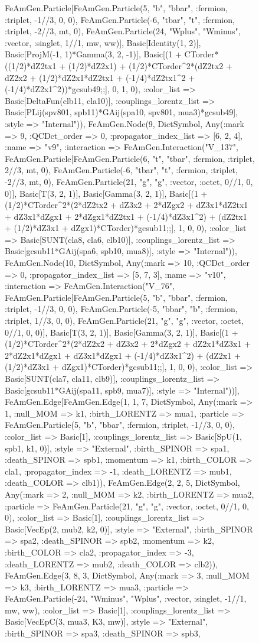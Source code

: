 \documentclass{revtex4}
\begin{document}
\begin{figure}[!htb]
\begin{center}
{FeAmGen.Particle[FeAmGen.Particle(5, "b", "bbar", :fermion, :triplet, -1//3, 0, 0), FeAmGen.Particle(-6, "tbar", "t", :fermion, :triplet, -2//3, mt, 0), FeAmGen.Particle(24, "Wplus", "Wminus", :vector, :singlet, 1//1, mw, ww)], Basic[Identity(1, 2)], Basic[ProjM(-1, 1)*Gamma(3, 2, -1)], Basic[(1 + CTorder*((1/2)*dZ2tx1 + (1/2)*dZ2x1) + (1/2)*CTorder^2*(dZ2tx2 + dZ2x2 + (1/2)*dZ2x1*dZ2tx1 + (-1/4)*dZ2tx1^2 + (-1/4)*dZ2x1^2))*gcsub49;;], 0, 1, 0), :color_list => Basic[DeltaFun(clb11, cla10)], :couplings_lorentz_list => Basic[PLij(spv801, spb11)*GAij(spa10, spv801, mua3)*gcsub49], :style => "Internal")), FeAmGen.Node(9, Dict{Symbol, Any}(:mark => 9, :QCDct_order => 0, :propagator_index_list => [6, 2, 4], :name => "v9", :interaction => FeAmGen.Interaction("V_137", FeAmGen.Particle[FeAmGen.Particle(6, "t", "tbar", :fermion, :triplet, 2//3, mt, 0), FeAmGen.Particle(-6, "tbar", "t", :fermion, :triplet, -2//3, mt, 0), FeAmGen.Particle(21, "g", "g", :vector, :octet, 0//1, 0, 0)], Basic[T(3, 2, 1)], Basic[Gamma(3, 2, 1)], Basic[(1 + (1/2)*CTorder^2*(2*dZ2tx2 + dZ3x2 + 2*dZgx2 + dZ3x1*dZ2tx1 + dZ3x1*dZgx1 + 2*dZgx1*dZ2tx1 + (-1/4)*dZ3x1^2) + (dZ2tx1 + (1/2)*dZ3x1 + dZgx1)*CTorder)*gcsub11;;], 1, 0, 0), :color_list => Basic[SUNT(cla8, cla6, clb10)], :couplings_lorentz_list => Basic[gcsub11*GAij(spa6, spb10, mua8)], :style => "Internal")), FeAmGen.Node(10, Dict{Symbol, Any}(:mark => 10, :QCDct_order => 0, :propagator_index_list => [5, 7, 3], :name => "v10", :interaction => FeAmGen.Interaction("V_76", FeAmGen.Particle[FeAmGen.Particle(5, "b", "bbar", :fermion, :triplet, -1//3, 0, 0), FeAmGen.Particle(-5, "bbar", "b", :fermion, :triplet, 1//3, 0, 0), FeAmGen.Particle(21, "g", "g", :vector, :octet, 0//1, 0, 0)], Basic[T(3, 2, 1)], Basic[Gamma(3, 2, 1)], Basic[(1 + (1/2)*CTorder^2*(2*dZ2x2 + dZ3x2 + 2*dZgx2 + dZ2x1*dZ3x1 + 2*dZ2x1*dZgx1 + dZ3x1*dZgx1 + (-1/4)*dZ3x1^2) + (dZ2x1 + (1/2)*dZ3x1 + dZgx1)*CTorder)*gcsub11;;], 1, 0, 0), :color_list => Basic[SUNT(cla7, cla11, clb9)], :couplings_lorentz_list => Basic[gcsub11*GAij(spa11, spb9, mua7)], :style => "Internal"))], FeAmGen.Edge[FeAmGen.Edge(1, 1, 7, Dict{Symbol, Any}(:mark => 1, :null_MOM => k1, :birth_LORENTZ => mua1, :particle => FeAmGen.Particle(5, "b", "bbar", :fermion, :triplet, -1//3, 0, 0), :color_list => Basic[1], :couplings_lorentz_list => Basic[SpU(1, spb1, k1, 0)], :style => "External", :birth_SPINOR => spa1, :death_SPINOR => spb1, :momentum => k1, :birth_COLOR => cla1, :propagator_index => -1, :death_LORENTZ => mub1, :death_COLOR => clb1)), FeAmGen.Edge(2, 2, 5, Dict{Symbol, Any}(:mark => 2, :null_MOM => k2, :birth_LORENTZ => mua2, :particle => FeAmGen.Particle(21, "g", "g", :vector, :octet, 0//1, 0, 0), :color_list => Basic[1], :couplings_lorentz_list => Basic[VecEp(2, mub2, k2, 0)], :style => "External", :birth_SPINOR => spa2, :death_SPINOR => spb2, :momentum => k2, :birth_COLOR => cla2, :propagator_index => -3, :death_LORENTZ => mub2, :death_COLOR => clb2)), FeAmGen.Edge(3, 8, 3, Dict{Symbol, Any}(:mark => 3, :null_MOM => k3, :birth_LORENTZ => mua3, :particle => FeAmGen.Particle(-24, "Wminus", "Wplus", :vector, :singlet, -1//1, mw, ww), :color_list => Basic[1], :couplings_lorentz_list => Basic[VecEpC(3, mua3, K3, mw)], :style => "External", :birth_SPINOR => spa3, :death_SPINOR => spb3, }
\end{center}
\end{figure}
\end{document}
